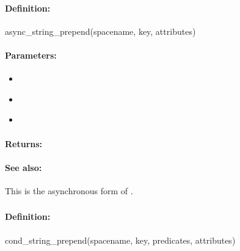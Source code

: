 \paragraph{Definition:}
\begin{rubycode}
async_string_prepend(spacename, key, attributes)
\end{rubycode}

\paragraph{Parameters:}
\begin{itemize}[noitemsep]
\item {}\\

\item {}\\

\item {}\\

\end{itemize}

\paragraph{Returns:}


\paragraph{See also:}  This is the asynchronous form of .

\pagebreak
\subsubsection{}
\label{api:ruby:cond_string_prepend}


\paragraph{Definition:}
\begin{rubycode}
cond_string_prepend(spacename, key, predicates, attributes)
\end{rubycode}

